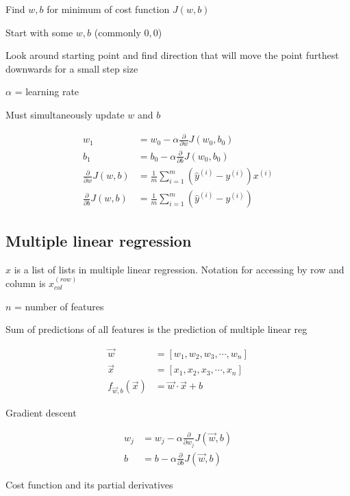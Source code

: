 \documentclass[12pt]{article}
\begin{document}
Find $w,b$ for minimum of cost function $J(w,b)$

\begin{myenumerate}
	\item Start with some $w,b$ (commonly $0,0$)
	\item Look around starting point and find direction that will move the point furthest downwards for a small step size
\end{myenumerate}

$\alpha$ = learning rate

Must simultaneously update $w$ and $b$

\begin{align*}
w_1 &= w_0 - \alpha \frac{\partial}{\partial w} J(w_0,b_0)\\
b_1 &= b_0 - \alpha \frac{\partial}{\partial b} J(w_0,b_0)\\
\frac{\partial}{\partial w} J(w,b) &= \frac{1}{m} \sum_{i=1}^m ({\hat y}^{(i)} - y^{(i)}) x^{(i)}\\
\frac{\partial}{\partial b} J(w,b) &= \frac{1}{m} \sum_{i=1}^m ({\hat y}^{(i)} - y^{(i)})
\end{align*}

\subsection{Multiple linear regression}

$x$ is a list of lists in multiple linear regression. Notation for accessing by row and column is $x_{col}^{(row)}$

$n$ = number of features

Sum of predictions of all features is the prediction of multiple linear reg

\begin{align*}
\vec w &= [w_1, w_2, w_3, \cdots, w_n]\\
\vec x &= [x_1, x_2, x_3, \cdots, x_n]\\
f_{\vec{w},b}(\vec{x}) &= \vec{w} \cdot \vec{x} + b
\end{align*}

Gradient descent

\begin{align*}
w_j &= w_j - \alpha \frac{\partial}{\partial w_j} J(\vec{w},b)\\
b &= b - \alpha \frac{\partial}{\partial b} J(\vec{w},b)
\end{align*}

Cost function and its partial derivatives
\end{document}
